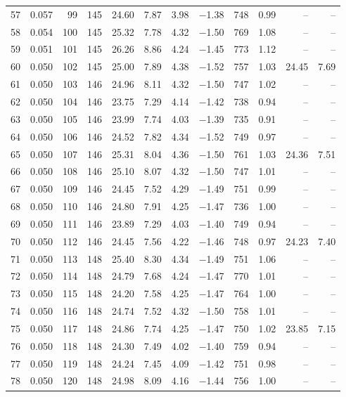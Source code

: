 \begin{table}[H]
\begin{tabular}{rrrrrrrrrrrr}
57 & 0.057 & 99 & 145 & 24.60 & 7.87 & 3.98 & $-$1.38 & 748 & 0.99 & -- & -- \\
58 & 0.054 & 100 & 145 & 25.32 & 7.78 & 4.32 & $-$1.50 & 769 & 1.08 & -- & -- \\
59 & 0.051 & 101 & 145 & 26.26 & 8.86 & 4.24 & $-$1.45 & 773 & 1.12 & -- & -- \\
60 & 0.050 & 102 & 145 & 25.00 & 7.89 & 4.38 & $-$1.52 & 757 & 1.03 & 24.45 & 7.69 \\
61 & 0.050 & 103 & 146 & 24.96 & 8.11 & 4.32 & $-$1.50 & 747 & 1.02 & -- & -- \\
62 & 0.050 & 104 & 146 & 23.75 & 7.29 & 4.14 & $-$1.42 & 738 & 0.94 & -- & -- \\
63 & 0.050 & 105 & 146 & 23.99 & 7.74 & 4.03 & $-$1.39 & 735 & 0.91 & -- & -- \\
64 & 0.050 & 106 & 146 & 24.52 & 7.82 & 4.34 & $-$1.52 & 749 & 0.97 & -- & -- \\
65 & 0.050 & 107 & 146 & 25.31 & 8.04 & 4.36 & $-$1.50 & 761 & 1.03 & 24.36 & 7.51 \\
66 & 0.050 & 108 & 146 & 25.10 & 8.07 & 4.32 & $-$1.50 & 747 & 1.01 & -- & -- \\
67 & 0.050 & 109 & 146 & 24.45 & 7.52 & 4.29 & $-$1.49 & 751 & 0.99 & -- & -- \\
68 & 0.050 & 110 & 146 & 24.80 & 7.91 & 4.25 & $-$1.47 & 736 & 1.00 & -- & -- \\
69 & 0.050 & 111 & 146 & 23.89 & 7.29 & 4.03 & $-$1.40 & 749 & 0.94 & -- & -- \\
70 & 0.050 & 112 & 146 & 24.45 & 7.56 & 4.22 & $-$1.46 & 748 & 0.97 & 24.23 & 7.40 \\
71 & 0.050 & 113 & 148 & 25.40 & 8.30 & 4.34 & $-$1.49 & 751 & 1.06 & -- & -- \\
72 & 0.050 & 114 & 148 & 24.79 & 7.68 & 4.24 & $-$1.47 & 770 & 1.01 & -- & -- \\
73 & 0.050 & 115 & 148 & 24.20 & 7.58 & 4.25 & $-$1.47 & 764 & 1.00 & -- & -- \\
74 & 0.050 & 116 & 148 & 24.74 & 7.52 & 4.32 & $-$1.50 & 758 & 1.01 & -- & -- \\
75 & 0.050 & 117 & 148 & 24.86 & 7.74 & 4.25 & $-$1.47 & 750 & 1.02 & 23.85 & 7.15 \\
76 & 0.050 & 118 & 148 & 24.30 & 7.49 & 4.02 & $-$1.40 & 759 & 0.94 & -- & -- \\
77 & 0.050 & 119 & 148 & 24.24 & 7.45 & 4.09 & $-$1.42 & 751 & 0.98 & -- & -- \\
78 & 0.050 & 120 & 148 & 24.98 & 8.09 & 4.16 & $-$1.44 & 756 & 1.00 & -- & -- \\

\end{tabular}
\end{table}
